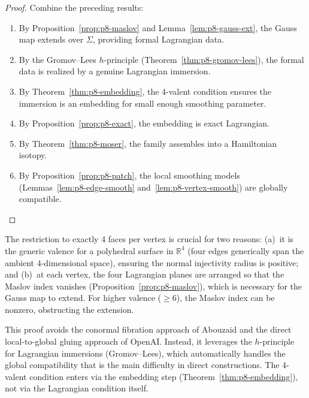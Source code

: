 \begin{proof}
Combine the preceding results:
\begin{enumerate}
\item By Proposition~\ref{prop:p8-maslov} and Lemma~\ref{lem:p8-gauss-ext},
the Gauss map extends over $\Sigma$, providing formal Lagrangian data.
\item By the Gromov--Lees $h$-principle (Theorem~\ref{thm:p8-gromov-lees}),
the formal data is realized by a genuine Lagrangian immersion.
\item By Theorem~\ref{thm:p8-embedding}, the 4-valent condition ensures the
immersion is an embedding for small enough smoothing parameter.
\item By Proposition~\ref{prop:p8-exact}, the embedding is exact Lagrangian.
\item By Theorem~\ref{thm:p8-moser}, the family assembles into a Hamiltonian
isotopy.
\item By Proposition~\ref{prop:p8-patch}, the local smoothing models
(Lemmas~\ref{lem:p8-edge-smooth} and~\ref{lem:p8-vertex-smooth}) are globally
compatible.
\end{enumerate}
\end{proof}

\begin{remark}
The restriction to exactly $4$ faces per vertex is crucial for two reasons:
(a)~it is the generic valence for a polyhedral surface in $\mathbb{R}^4$
(four edges generically span the ambient $4$-dimensional space), ensuring
the normal injectivity radius is positive; and
(b)~at each vertex, the four Lagrangian planes are arranged so that the Maslov
index vanishes (Proposition~\ref{prop:p8-maslov}), which is necessary for
the Gauss map to extend. For higher valence ($\ge 6$), the Maslov index can
be nonzero, obstructing the extension.
\end{remark}

\begin{remark}
This proof avoids the conormal fibration approach of Abouzaid and the
direct local-to-global gluing approach of OpenAI. Instead, it leverages the
$h$-principle for Lagrangian immersions (Gromov--Lees), which automatically
handles the global compatibility that is the main difficulty in direct
constructions. The 4-valent condition enters via the embedding step
(Theorem~\ref{thm:p8-embedding}), not via the Lagrangian condition itself.
\end{remark}

